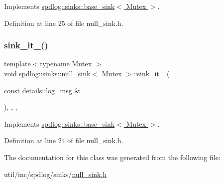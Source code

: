 Implements \hyperlink{classspdlog_1_1sinks_1_1base__sink_a5ac2b237c60f68a18122a1ca09b812b4}{spdlog\+::sinks\+::base\+\_\+sink$<$ Mutex $>$}.



Definition at line 25 of file null\+\_\+sink.\+h.

\mbox{\label{classspdlog_1_1sinks_1_1null__sink_a158c702167f6a46609de2c561f82973c}} 
\subsubsection{\texorpdfstring{sink\+\_\+it\+\_\+()}{sink\_it\_()}}
{\footnotesize\ttfamily template$<$typename Mutex $>$ \\
void \hyperlink{classspdlog_1_1sinks_1_1null__sink}{spdlog\+::sinks\+::null\+\_\+sink}$<$ Mutex $>$\+::sink\+\_\+it\+\_\+ (\begin{DoxyParamCaption}\item[{const \hyperlink{structspdlog_1_1details_1_1log__msg}{details\+::log\+\_\+msg} \&}]{ }\end{DoxyParamCaption})\hspace{0.3cm}{\ttfamily [inline]}, {\ttfamily [override]}, {\ttfamily [protected]}, {\ttfamily [virtual]}}



Implements \hyperlink{classspdlog_1_1sinks_1_1base__sink_ad698d300cb7f5e58b2aa1b9907cdbd87}{spdlog\+::sinks\+::base\+\_\+sink$<$ Mutex $>$}.



Definition at line 24 of file null\+\_\+sink.\+h.



The documentation for this class was generated from the following file\+:\begin{DoxyCompactItemize}
\item 
util/inc/spdlog/sinks/\hyperlink{null__sink_8h}{null\+\_\+sink.\+h}\end{DoxyCompactItemize}
